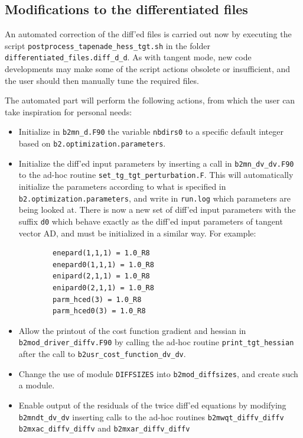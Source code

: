\subsection{Modifications to the differentiated files}\label{sec:diff_files_tgttgt}

An automated correction of the diff'ed files is carried out now by executing the script {\tt postprocess\_tapenade\_hess\_tgt.\allowbreak sh} in the folder {\tt differentiated\_files.diff\_d\_d}. As with tangent mode, new code developments may make some of the script actions obsolete or insufficient, and the user should then manually tune the required files.

The automated part will perform the following actions, from which the user can take inspiration for personal needs:
\begin{itemize}
	\item Initialize in {\tt b2mn\_d.F90} the variable {\tt nbdirs0} to a specific default integer based on {\tt b2.optimization.parameters}.

	\item Initialize the diff'ed input parameters by inserting a call in {\tt b2mn\_dv\_dv.F90} to the ad-hoc routine {\tt set\_tg\_tgt\_perturbation.F}. This will automatically initialize the parameters according to what is specified in {\tt b2.optimization.parameters}, and write in {\tt run.log} which parameters are being looked at. There is now a new set of diff'ed input parameters with the suffix {\tt d0} which behave exactly as the diff'ed input parameters of tangent vector AD, and must be initialized in a similar way. For example:
	\begin{verbatim}
		enepard(1,1,1) = 1.0_R8
		enepard0(1,1,1) = 1.0_R8
		enipard(2,1,1) = 1.0_R8
		enipard0(2,1,1) = 1.0_R8
		parm_hced(3) = 1.0_R8
		parm_hced0(3) = 1.0_R8
	\end{verbatim}

	\item Allow the printout of the cost function gradient and hessian in {\tt b2mod\_driver\_diffv.F90} by calling the ad-hoc routine {\tt print\_tgt\_hessian} after the call to {\tt b2usr\_cost\_function\_dv\_dv}.

	\item Change the use of module {\tt DIFFSIZES} into {\tt b2mod\_diffsizes}, and create such a module.

	\item Enable output of the residuals of the twice diff'ed equations by modifying {\tt b2mndt\_dv\_dv} inserting calls to the ad-hoc routines {\tt b2mwqt\_diffv\_diffv} {\tt b2mxac\_diffv\_diffv} and {\tt b2mxar\_diffv\_diffv}
\end{itemize}

